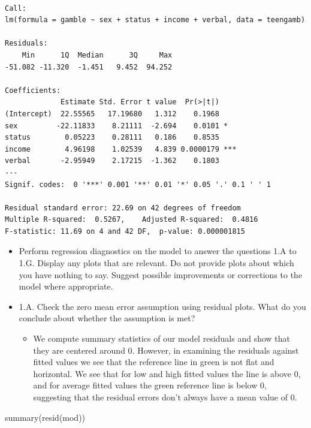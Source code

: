 \documentclass[
  letterpaper,
  DIV=11,
  numbers=noendperiod]{scrartcl}
\newenvironment{Shaded}{\begin{snugshade}}{\end{snugshade}}
\newcommand{\FunctionTok}[1]{\textcolor[rgb]{0.28,0.35,0.67}{#1}}
\newcommand{\NormalTok}[1]{\textcolor[rgb]{0.00,0.23,0.31}{#1}}
\providecommand{\tightlist}{%
  \setlength{\itemsep}{0pt}\setlength{\parskip}{0pt}}\usepackage{longtable,booktabs,array}
\begin{document}
\begin{verbatim}

Call:
lm(formula = gamble ~ sex + status + income + verbal, data = teengamb)

Residuals:
    Min      1Q  Median      3Q     Max 
-51.082 -11.320  -1.451   9.452  94.252 

Coefficients:
             Estimate Std. Error t value  Pr(>|t|)    
(Intercept)  22.55565   17.19680   1.312    0.1968    
sex         -22.11833    8.21111  -2.694    0.0101 *  
status        0.05223    0.28111   0.186    0.8535    
income        4.96198    1.02539   4.839 0.0000179 ***
verbal       -2.95949    2.17215  -1.362    0.1803    
---
Signif. codes:  0 '***' 0.001 '**' 0.01 '*' 0.05 '.' 0.1 ' ' 1

Residual standard error: 22.69 on 42 degrees of freedom
Multiple R-squared:  0.5267,    Adjusted R-squared:  0.4816 
F-statistic: 11.69 on 4 and 42 DF,  p-value: 0.000001815
\end{verbatim}

\begin{itemize}
\tightlist
\item
  Perform regression diagnostics on the model to answer the questions
  1.A to 1.G. Display any plots that are relevant. Do not provide plots
  about which you have nothing to say. Suggest possible improvements or
  corrections to the model where appropriate.
\end{itemize}

\begin{itemize}
\item
  1.A. Check the zero mean error assumption using residual plots. What
  do you conclude about whether the assumption is met?

  \begin{itemize}
  \tightlist
  \item
    We compute summary statistics of our model residuals and show that
    they are centered around 0. However, in examining the residuals
    against fitted values we see that the reference line in green is not
    flat and horizontal. We see that for low and high fitted values the
    line is above 0, and for average fitted values the green reference
    line is below 0, suggesting that the residual errors don't always
    have a mean value of 0.
  \end{itemize}
\end{itemize}

\begin{Shaded}
\begin{Highlighting}[]
\FunctionTok{summary}\NormalTok{(}\FunctionTok{resid}\NormalTok{(mod))}
\end{Highlighting}
\end{Shaded}
\end{document}
